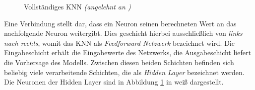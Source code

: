\begin{figure}[h]
   \centering
		\caption{Vollständiges \ac{KNN} \emph{(angelehnt an \cite{visualApproach})}}
      \label{fig:KNN}
\end{figure}

Eine Verbindung stellt dar, dass ein Neuron seinen berechneten Wert an das nachfolgende Neuron weitergibt. Dies geschieht hierbei ausschließlich von \emph{links nach rechts}, womit das \ac{KNN} als \emph{Feedforward-Netzwerk} bezeichnet wird. Die Eingabeschicht erhält die Eingabewerte des Netzwerks, die Ausgabeschicht liefert die Vorhersage des Modells. Zwischen diesen beiden Schichten befinden sich beliebig viele verarbeitende Schichten, die als \emph{Hidden Layer} bezeichnet werden. Die Neuronen der Hidden Layer sind in Abbildung \ref{fig:KNN} in weiß dargestellt. \cite{knnsKompakt}

